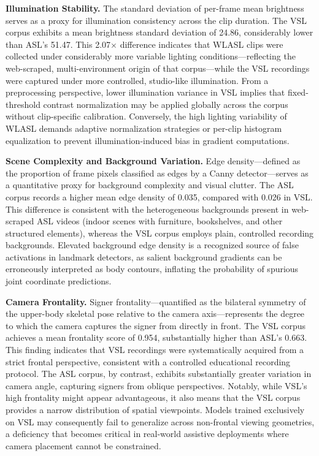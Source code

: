 \documentclass{ieeeaccess}
\DeclareRobustCommand{\textbf}[1]{{\bfseries #1}}
\begin{document}
\textbf{Illumination Stability.} The standard deviation of per-frame mean brightness serves as a proxy for illumination consistency across the clip duration. The VSL corpus exhibits a mean brightness standard deviation of 24.86, considerably lower than ASL's 51.47. This 2.07$\times$ difference indicates that WLASL clips were collected under considerably more variable lighting conditions—reflecting the web-scraped, multi-environment origin of that corpus—while the VSL recordings were captured under more controlled, studio-like illumination. From a preprocessing perspective, lower illumination variance in VSL implies that fixed-threshold contrast normalization may be applied globally across the corpus without clip-specific calibration. Conversely, the high lighting variability of WLASL demands adaptive normalization strategies or per-clip histogram equalization to prevent illumination-induced bias in gradient computations.

\textbf{Scene Complexity and Background Variation.} Edge density—defined as the proportion of frame pixels classified as edges by a Canny detector—serves as a quantitative proxy for background complexity and visual clutter. The ASL corpus records a higher mean edge density of 0.035, compared with 0.026 in VSL. This difference is consistent with the heterogeneous backgrounds present in web-scraped ASL videos (indoor scenes with furniture, bookshelves, and other structured elements), whereas the VSL corpus employs plain, controlled recording backgrounds. Elevated background edge density is a recognized source of false activations in landmark detectors, as salient background gradients can be erroneously interpreted as body contours, inflating the probability of spurious joint coordinate predictions.

\textbf{Camera Frontality.} Signer frontality—quantified as the bilateral symmetry of the upper-body skeletal pose relative to the camera axis—represents the degree to which the camera captures the signer from directly in front. The VSL corpus achieves a mean frontality score of 0.954, substantially higher than ASL's 0.663. This finding indicates that VSL recordings were systematically acquired from a strict frontal perspective, consistent with a controlled educational recording protocol. The ASL corpus, by contrast, exhibits substantially greater variation in camera angle, capturing signers from oblique perspectives. Notably, while VSL's high frontality might appear advantageous, it also means that the VSL corpus provides a narrow distribution of spatial viewpoints. Models trained exclusively on VSL may consequently fail to generalize across non-frontal viewing geometries, a deficiency that becomes critical in real-world assistive deployments where camera placement cannot be constrained.
\end{document}
